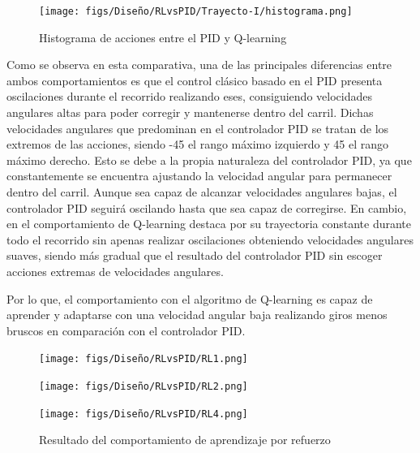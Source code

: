 \begin{figure} [H]
  \begin{center}
    \texttt{[image: figs/Diseño/RLvsPID/Trayecto-I/histograma.png]}
  \end{center}
  \caption{Histograma de acciones entre el PID y Q-learning }
  \label{Histograma-PIDVSQL}
  \vspace{-1.5em}
\end{figure}

Como se observa en esta comparativa, una de las principales diferencias entre ambos comportamientos es que el control clásico basado en el PID presenta oscilaciones durante el recorrido  
realizando eses, consiguiendo velocidades angulares altas para poder corregir y mantenerse dentro del carril. Dichas velocidades angulares que predominan en el controlador PID se tratan 
de los extremos de las acciones, siendo -45 el rango máximo izquierdo y 45 el rango máximo derecho. Esto se debe a la propia naturaleza del controlador PID, ya que constantemente se encuentra 
ajustando la velocidad angular para permanecer dentro del carril. Aunque sea capaz de alcanzar velocidades angulares bajas, el controlador PID seguirá oscilando hasta que sea capaz de 
corregirse. En cambio, en el comportamiento de Q-learning destaca por su trayectoria constante 
durante todo el recorrido sin apenas realizar oscilaciones obteniendo velocidades angulares suaves, siendo
más gradual que el resultado del controlador PID sin escoger acciones extremas de velocidades angulares. 

Por lo que, el comportamiento con el algoritmo de Q-learning es capaz de aprender y adaptarse con una velocidad angular baja 
realizando giros menos bruscos en comparación con el controlador PID.

\begin{figure}[H]
  \centering
  \begin{minipage}{0.3\textwidth}
    \texttt{[image: figs/Diseño/RLvsPID/RL1.png]}
  \end{minipage}
  \hfill
  \begin{minipage}{0.3\textwidth}
    \texttt{[image: figs/Diseño/RLvsPID/RL2.png]}
  \end{minipage}
  \hfill
  \begin{minipage}{0.3\textwidth}
    \texttt{[image: figs/Diseño/RLvsPID/RL4.png]}
  \end{minipage}
  \caption{Resultado del comportamiento de aprendizaje por refuerzo}
  \label{fig:Resultado-imagenes}
  \vspace{-1.5em}
\end{figure}

